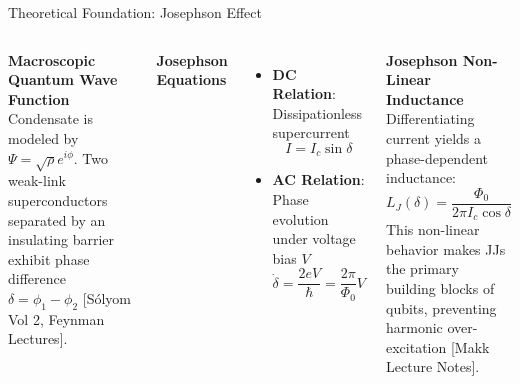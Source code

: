 \documentclass[aspectratio=169]{beamer}
\begin{document}
\begin{frame}{Theoretical Foundation: Josephson Effect}
    \begin{columns}
        \textbf{Macroscopic Quantum Wave Function} \\
        Condensate is modeled by $\Psi = \sqrt{\rho} e^{i\phi}$. Two weak-link superconductors separated by an insulating barrier exhibit phase difference $\delta = \phi_1 - \phi_2$ [Sólyom Vol 2, Feynman Lectures].
        
        \vspace{0.2cm}
        \textbf{Josephson Equations} \\
        \begin{itemize}
            \item \textbf{DC Relation}: Dissipationless supercurrent
            \begin{equation}
                I = I_c \sin\delta
            \end{equation}
            \item \textbf{AC Relation}: Phase evolution under voltage bias $V$
            \begin{equation}
                \dot{\delta} = \frac{2eV}{\hbar} = \frac{2\pi}{\Phi_0} V
            \end{equation}
        \end{itemize}
        
        \textbf{Josephson Non-Linear Inductance} \\
        Differentiating current yields a phase-dependent inductance:
        \begin{equation}
            L_J(\delta) = \frac{\Phi_0}{2\pi I_c \cos\delta}
        \end{equation}
        This non-linear behavior makes JJs the primary building blocks of qubits, preventing harmonic over-excitation [Makk Lecture Notes].
    \end{columns}
\end{frame}
\end{document}

